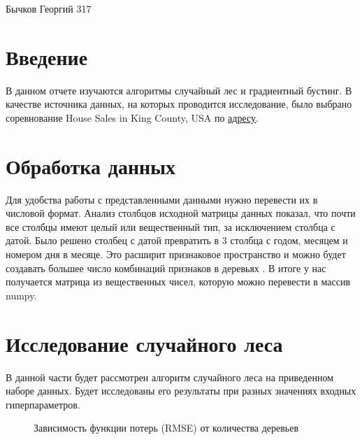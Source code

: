 \documentclass[oneside,final,12pt]{article}
\begin{document}
Бычков Георгий 317
\tableofcontents
\newpage

\section {Введение}
	В данном отчете изучаются алгоритмы случайный лес и градиентный бустинг. В качестве источника данных, на которых проводится исследование, было выбрано соревнование House Sales in King County, USA по \href{https://www.kaggle.com/harlfoxem/housesalesprediction}{адресу}.

\section {Обработка данных}
	Для удобства работы с представленными данными нужно перевести их в числовой формат. Анализ столбцов исходной матрицы данных показал, что почти все столбцы имеют целый или вещественный тип, за исключением столбца с датой. Было решено столбец с датой превратить в 3 столбца с годом, месяцем и номером дня в месяце. Это расширит признаковое пространство и можно будет создавать большее число комбинаций признаков в деревьях . В итоге у нас получается матрица из вещественных чисел, которую можно перевести в массив numpy.

\section {Исследование случайного леса}
	В данной части будет рассмотрен алгоритм случайного леса на приведенном наборе данных. Будет исследованы его результаты при разных значениях входных гиперпараметров.
\begin{figure}[h!]
\caption{Зависимость функции потерь (RMSE) от количества деревьев}
\label{fig:image1}
\end{figure}
\end{document}
